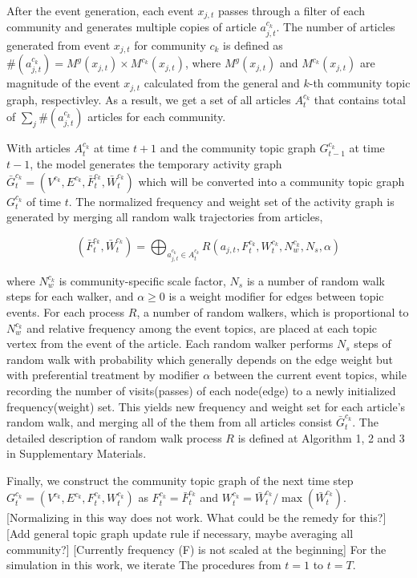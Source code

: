 \documentclass{nature}
\begin{document}
\begin{methods}
After the event generation, each event $x_{j, t}$ passes through a filter of each community and generates multiple copies of article $a_{j, t}^{c_k}$. The number of articles generated from event $x_{j, t}$ for community $c_k$ is defined as $\#(a_{j, t}^{c_k}) = M^g(x_{j, t}) \times M^{c_k}(x_{j, t})$, where $M^g(x_{j, t})$ and $M^{c_k}(x_{j, t})$ are magnitude of the event $x_{j, t}$ calculated from the general and $k$-th community topic graph, respectivley. As a result, we get a set of all articles $A_{t}^{c_k}$ that contains total of  $\sum_j \#(a_{j, t}^{c_k})$ articles for each community.

With articles $A_{t}^{c_k}$ at time $t+1$ and the community topic graph $G^{c_k}_{t-1}$ at time $t-1$, the model generates the temporary activity graph $\bar{G}_{t}^{c_k} = (V^{c_k}, E^{c_k}, \bar{F}_{t}^{c_k}, \bar{W}_{t}^{c_k})$ which will be converted into a community topic graph $G_{t}^{c_k}$ of time $t$. The normalized frequency and weight set of the activity graph is generated by merging all random walk trajectories from articles, 

\begin{equation}
  (\bar{F}_{t}^{c_k}, \bar{W}_{t}^{c_k})=  \bigoplus_{a_{j, t}^{c_k} \in A_{t}^{c_k}} R(a_{j, t}, F_t^{c_k}, W_t^{c_k}, N_w^{c_k}, N_s, \alpha)
\end{equation}

 where $N_w^{c_k}$ is community-specific scale factor, $N_s$ is a number of random walk steps for each walker, and $\alpha \geq 0$ is a weight modifier for edges between topic events. For each process $R$, a number of random walkers, which is proportional to $N_w^{c_k}$ and relative frequency among the event topics, are placed at each topic vertex from the event of the article. Each random walker performs $N_s$ steps of random walk with probability which generally depends on the edge weight but with preferential treatment by modifier $\alpha$ between the current event topics, while recording the number of visits(passes) of each node(edge) to a newly initialized frequency(weight) set. This yields new frequency and weight set for each article's random walk, and merging all of the them from all articles consist $\bar{G}_{t}^{c_k}$. The detailed description of random walk process $R$ is defined at Algorithm 1, 2 and 3 in Supplementary Materials.

Finally, we construct the community topic graph of the next time step $G^{c_k}_{t} = (V^{c_k}, E^{c_k}, F_{t}^{c_k}, \allowbreak W_{t}^{c_k})$ as $F_{t}^{c_k} = \bar{F}_{t}^{c_k}$ and $W_{t}^{c_k} = \bar{W}_{t}^{c_k} / \max(\bar{W}_{t}^{c_k})$. [Normalizing in this way does not work. What could be the remedy for this?] [Add general topic graph update rule if necessary, maybe averaging all community?] [Currently frequency (F) is not scaled at the beginning] For the simulation in this work, we iterate The procedures from $t=1$ to $t=T$.


\end{methods}
\end{document}
